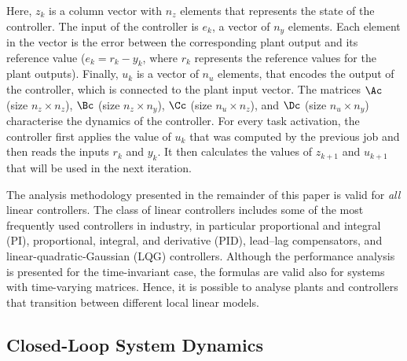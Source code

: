 Here, $z_k$ is a column vector with $n_z$ elements that represents the state of the controller.
The input of the controller is $e_k$, a vector of $n_y$ elements.
Each element in the vector is the error between the corresponding plant output and its reference value ($e_k = r_k - y_k$, where $r_k$ represents the reference values for the plant outputs).
Finally, $u_k$ is a vector of $n_u$ elements, that encodes the output of the controller, which is connected to the plant input vector.
The matrices $\Ac$ (size $n_z \times n_z$), $\Bc$ (size $n_z \times n_y$), $\Cc$ (size $n_u \times n_z$), and $\Dc$ (size $n_u \times n_y$) characterise the dynamics of the controller.
For every task activation, the controller first applies the value of $u_k$ that was computed by the previous job and then reads the inputs $r_k$ and $y_k$.
It then calculates the values of $z_{k+1}$ and $u_{k+1}$ that will be used in the next iteration.

The analysis methodology presented in the remainder of this paper is valid for \emph{all} linear controllers.
The class of linear controllers includes some of the most frequently used controllers in industry, in particular proportional and integral (PI), proportional, integral, and derivative (PID), lead--lag compensators, and linear-quadratic-Gaussian (LQG) controllers.
Although the performance analysis is presented for the time-invariant case, the formulas are valid also for systems with time-varying matrices.
Hence, it is possible to analyse plants and controllers that transition between different local linear models.

\subsection{Closed-Loop System Dynamics}
\label{sec:cldynamics}

